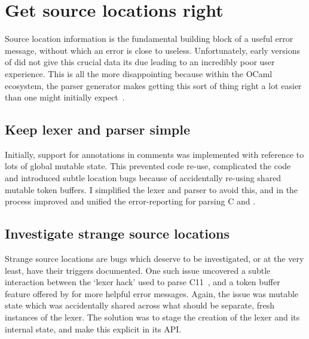 \section{Get source locations right}

Source location information is the fundamental building block of a useful error
message, without which an error is close to useless. Unfortunately, early
versions of  did not give this crucial data its due leading to an
incredibly poor user experience. This is all the more disappointing because
within the OCaml ecosystem, the  parser generator makes getting this
sort of thing right a lot easier than one might initially
expect~.

\subsection{Keep lexer and parser simple}

Initially, support for 
annotations in comments was implemented with reference to lots of global
mutable state.
This prevented code re-use, complicated the code and introduced subtle
location bugs because of accidentally re-using shared mutable token
buffers. I simplified the lexer and parser to avoid this, and in the
process improved and unified the error-reporting for parsing C and
.

\subsection{Investigate strange source locations}

Strange source locations are
bugs which deserve to be investigated, or at the very least, have their
triggers documented. One such
issue
uncovered a subtle interaction between the `lexer hack' used to parse
C11~, and a token buffer feature offered by
 for more helpful error messages. Again, the issue was mutable state
which was accidentally shared across what should be separate, fresh instances
of the lexer. The solution was to stage the creation of the lexer and its
internal state, and make this explicit in its
API.

